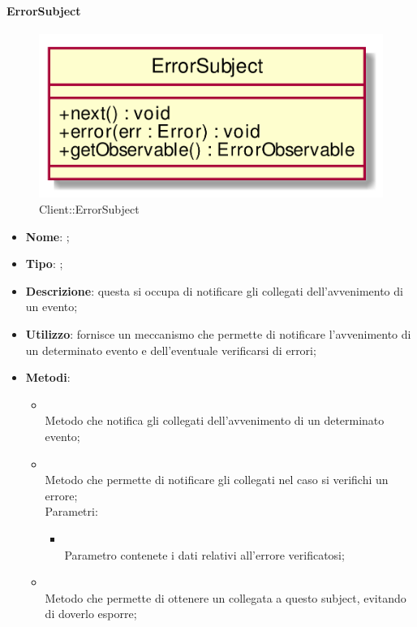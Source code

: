 \hypertarget{ErrorSubject_label}{\paragraph{ErrorSubject}}
\begin{figure}[h]
	\centering
	\includegraphics[width=\textwidth,height=\textheight,keepaspectratio]{images/ClassErrorSubject.png}
	\caption{Client::ErrorSubject}
\end{figure}
\begin{itemize}
	\item \textbf{Nome}: ;
	\item \textbf{Tipo}: ;
	\item \textbf{Descrizione}: questa si occupa di notificare gli  collegati dell'avvenimento di un evento;
	\item \textbf{Utilizzo}: fornisce un meccanismo che permette di notificare l'avvenimento di un determinato evento e dell'eventuale verificarsi di errori;
	\item \textbf{Metodi}:
	\begin{itemize}
		\item[]  \\
		Metodo che notifica gli  collegati dell'avvenimento di un determinato evento;\\
		\item[]  \\
		Metodo che permette di notificare gli  collegati nel caso si verifichi un errore;\\
		Parametri:
		\begin{itemize}
			\item {} \\
			Parametro contenete i dati relativi all'errore verificatosi;
		\end{itemize}
		\item[]  \\
		Metodo che permette di ottenere un  collegata a questo subject, evitando di doverlo esporre;\\
	\end{itemize}
\end{itemize}
\FloatBarrier

